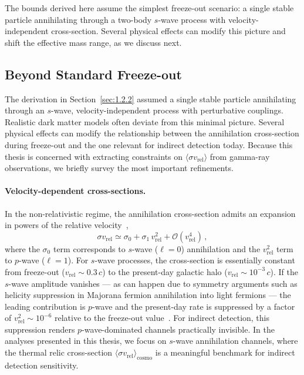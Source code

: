 The bounds derived here assume the simplest freeze-out scenario: a single stable particle annihilating through a two-body $s$-wave process with velocity-independent cross-section.
Several physical effects can modify this picture and shift the effective mass range, as we discuss next.

\subsection{Beyond Standard Freeze-out}
\label{sec:1.2.4}

The derivation in Section~\ref{sec:1.2.2} assumed a single stable particle annihilating through an $s$-wave, velocity-independent process with perturbative couplings.
Realistic dark matter models often deviate from this minimal picture.
Several physical effects can modify the relationship between the annihilation cross-section during freeze-out and the one relevant for indirect detection today.
Because this thesis is concerned with extracting constraints on $\langle \sigma v_\mathrm{rel} \rangle$ from gamma-ray observations, we briefly survey the most important refinements.

\paragraph{Velocity-dependent cross-sections.} In the non-relativistic regime, the annihilation cross-section admits an expansion in powers of the relative velocity~\cite{Cirelli:2024ssz},
\begin{equation}
	\sigma v_\mathrm{rel} \simeq \sigma_0 + \sigma_1\, v_\mathrm{rel}^2 + \mathcal{O}(v_\mathrm{rel}^4) \,,
	\label{eq:partial_wave}
\end{equation}
where the $\sigma_0$ term corresponds to $s$-wave ($\ell = 0$) annihilation and the $v_\mathrm{rel}^2$ term to $p$-wave ($\ell = 1$).
For $s$-wave processes, the cross-section is essentially constant from freeze-out ($v_\mathrm{rel} \sim 0.3\,c$) to the present-day galactic halo ($v_\mathrm{rel} \sim 10^{-3}\,c$).
If the $s$-wave amplitude vanishes --- as can happen due to symmetry arguments such as helicity suppression in Majorana fermion annihilation into light fermions --- the leading contribution is $p$-wave and the present-day rate is suppressed by a factor of $v_\mathrm{rel}^2 \sim 10^{-6}$ relative to the freeze-out value~\cite{Cirelli:2024ssz}.
For indirect detection, this suppression renders $p$-wave-dominated channels practically invisible.
In the analyses presented in this thesis, we focus on $s$-wave annihilation channels, where the thermal relic cross-section $\langle \sigma v_\mathrm{rel} \rangle_\mathrm{cosmo}$ is a meaningful benchmark for indirect detection sensitivity.

